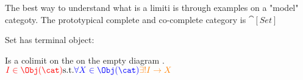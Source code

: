 \documentclass[preview]{standalone}
\begin{document}
%
The best way to understand what is a limiti is through examples on a "model" categoty. The prototypical complete and co-complete category is $\cat[Set]$


\begin{minipage}[t]{0.5\textwidth}
\begin{example}[]
	Set has terminal object:
	
\end{example}
\end{minipage}
\vrule{}
\begin{minipage}[t]{0.5\textwidth}
\begin{example}
	Is a colimit on the on the empty diagram .\\
	$\textcolor{red}{I\in \Obj(\cat)} \St 
	 \textcolor{blue}{\forall X \in \Obj	(\cat)}
	 \textcolor{orange}{\exists! I\rightarrow X}$\\


\end{example}
\end{minipage}
\end{document}
